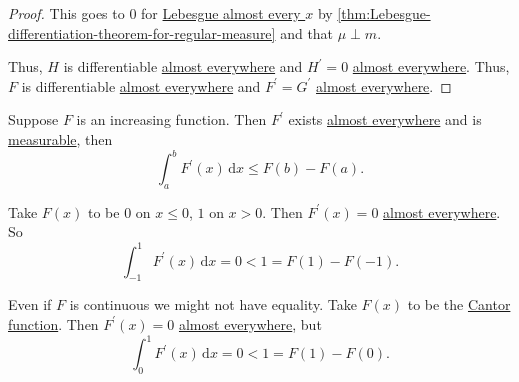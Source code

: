 \begin{proof}
	This goes to \(0\) for \hyperref[def:mu-almost-everywhere]{Lebesgue almost every \(x\)} by \autoref{thm:Lebesgue-differentiation-theorem-for-regular-measure}
	and that \(\mu \perp m\).

	Thus, \(H\) is differentiable \hyperref[def:mu-almost-everywhere]{almost everywhere} and \(H^\prime = 0\) \hyperref[def:mu-almost-everywhere]{almost everywhere}.
	Thus, \(F\) is differentiable \hyperref[def:mu-almost-everywhere]{almost everywhere} and \(F^\prime = G^\prime\) \hyperref[def:mu-almost-everywhere]{almost everywhere}.
\end{proof}

\begin{proposition}
	Suppose \(F\) is an increasing function. Then \(F^\prime\) exists \hyperref[def:mu-almost-everywhere]{almost everywhere} and is
	\hyperref[def:measurable-function]{measurable}, then
	\[
		\int_a^b F^\prime (x) \,\mathrm{d}x \leq F(b) - F(a).
	\]
\end{proposition}

\begin{eg}
	Take \(F(x)\) to be \(0\) on \(x \leq 0\), \(1\) on \(x > 0\). Then \(F^\prime(x) = 0\) \hyperref[def:mu-almost-everywhere]{almost everywhere}. So
	\[
		\int_{-1}^1 F^\prime(x) \,\mathrm{d}x = 0 < 1 = F(1) - F(-1).
	\]

	Even if \(F\) is continuous we might not have equality. Take \(F(x)\) to be the \hyperref[sssec:Cantor-Function]{Cantor function}.
	Then \(F^\prime(x) = 0\) \hyperref[def:mu-almost-everywhere]{almost everywhere}, but
	\[
		\int_0^1 F^\prime(x) \,\mathrm{d}x = 0 < 1 = F(1) - F(0).
	\]
\end{eg}
